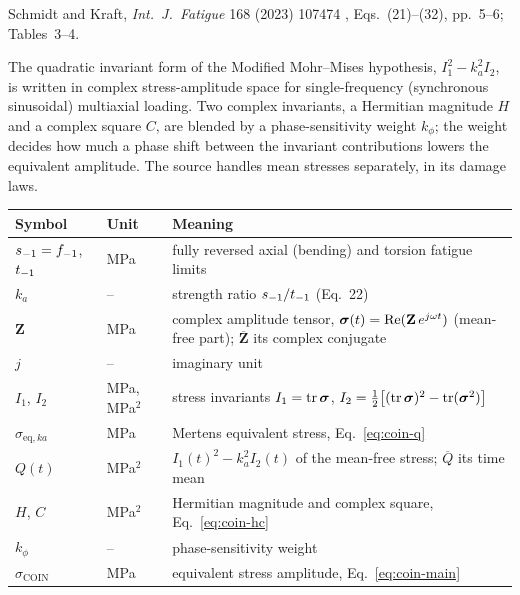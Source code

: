 \label{sheet:COIN}

 Schmidt and Kraft, \emph{Int.\ J.\ Fatigue} 168 (2023) 107474 \cite{schmidt2023},
Eqs.~(21)--(32), pp.~5--6; Tables~3--4.

 The quadratic invariant form of the Modified Mohr--Mises hypothesis,
$I_1^2-k_a^2I_2$, is written in complex stress-amplitude space for single-frequency (synchronous
sinusoidal) multiaxial loading. Two complex invariants, a Hermitian magnitude $H$ and a complex square
$C$, are blended by a phase-sensitivity weight $k_\phi$; the weight decides how much a phase shift
between the invariant contributions lowers the equivalent amplitude. The source handles mean stresses
separately, in its damage laws.

\begin{center}\small
\begin{tabular}{@{}llp{100mm}@{}}
\toprule
Symbol & Unit & Meaning\\\midrule
$s_{-1}=f_{-1}$, $t_{-1}$ & MPa & fully reversed axial (bending) and torsion fatigue limits\\
$k_a$ & -- & strength ratio $s_{-1}/t_{-1}$ (Eq.~22)\\
$\mathbf Z$ & MPa & complex amplitude tensor, $\boldsymbol\sigma(t)=\operatorname{Re}(\mathbf Z\,e^{j\omega t})$ (mean-free part); $\overline{\mathbf Z}$ its complex conjugate\\
$j$ & -- & imaginary unit\\
$I_1$, $I_2$ & MPa, MPa$^2$ & stress invariants $I_1=\operatorname{tr}\boldsymbol\sigma$, $I_2=\tfrac12\bigl[(\operatorname{tr}\boldsymbol\sigma)^2-\operatorname{tr}(\boldsymbol\sigma^2)\bigr]$\\
$\sigma_{\mathrm{eq},ka}$ & MPa & Mertens equivalent stress, Eq.~\eqref{eq:coin-q}\\
$Q(t)$ & MPa$^2$ & $I_1(t)^2-k_a^2I_2(t)$ of the mean-free stress; $\overline Q$ its time mean\\
$H$, $C$ & MPa$^2$ & Hermitian magnitude and complex square, Eq.~\eqref{eq:coin-hc}\\
$k_\phi$ & -- & phase-sensitivity weight\\
$\sigma_{\mathrm{COIN}}$ & MPa & equivalent stress amplitude, Eq.~\eqref{eq:coin-main}\\
\bottomrule
\end{tabular}
\end{center}

